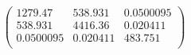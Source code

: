 \documentclass{article}
\begin{document}
\[\left(
\begin{array}{ccc}
 1279.47 & 538.931 & 0.0500095 \\
 538.931 & 4416.36 & 0.020411 \\
 0.0500095 & 0.020411 & 483.751 \\
\end{array}
\right)\]
\end{document}

